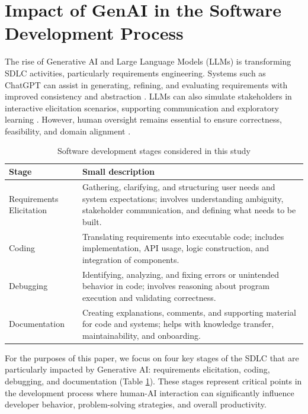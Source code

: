 \section{Impact of GenAI in the Software Development Process}
The rise of Generative AI and Large Language Models (LLMs) is transforming SDLC activities, particularly requirements engineering. Systems such as ChatGPT can assist in generating, refining, and evaluating requirements with improved consistency and abstraction \cite{aloshan2023zeroshot}. LLMs can also simulate stakeholders in interactive elicitation scenarios, supporting communication and exploratory learning \cite{debnath2020virtualclient}. However, human oversight remains essential to ensure correctness, feasibility, and domain alignment \cite{bang2023multilingualmultimodalevaluation}.

\begin{table}
    \caption{Software development stages considered in this study}
    \label{tab:stages:re}
    \begin{tabular}{p{} p{}}
        \toprule
        Stage                    & Small description                                                                                                                                                            \\
        \midrule
        Requirements Elicitation & Gathering, clarifying, and structuring user needs and system expectations; involves understanding ambiguity, stakeholder communication, and defining what needs to be built. \\

        Coding                   & Translating requirements into executable code; includes implementation, API usage, logic construction, and integration of components.                                        \\

        Debugging                & Identifying, analyzing, and fixing errors or unintended behavior in code; involves reasoning about program execution and validating correctness.                             \\

        Documentation            & Creating explanations, comments, and supporting material for code and systems; helps with knowledge transfer, maintainability, and onboarding.                               \\
        \bottomrule
    \end{tabular}
\end{table}

For the purposes of this paper, we focus on four key stages of the SDLC that are particularly impacted by Generative AI: requirements elicitation, coding, debugging, and documentation (Table \ref{tab:stages:re}). These stages represent critical points in the development process where human-AI interaction can significantly influence developer behavior, problem-solving strategies, and overall productivity.